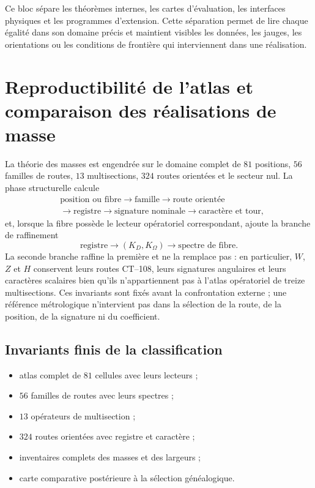Ce bloc sépare les théorèmes internes, les cartes d'évaluation, les
interfaces physiques et les programmes d'extension. Cette séparation permet de lire
chaque égalité dans son domaine précis et maintient visibles les données, les jauges,
les orientations ou les conditions de frontière qui interviennent dans une réalisation.

\HMTDemoteHeadings


\HMTRestoreHeadings

\chapter{Reproductibilité de l'atlas et comparaison des réalisations de masse}
\label{app:reproducibilidad-masas-acumulativa}
\label{app:suplemento-digital-masas-rev11}

La théorie des masses est engendrée sur le domaine complet de
\(81\) positions, \(56\) familles de routes, \(13\) multisections,
\(324\) routes orientées et le secteur nul. La phase structurelle calcule
\[
\begin{aligned}
&\text{position ou fibre}\longrightarrow\text{famille}
\longrightarrow\text{route orientée}\\
&\longrightarrow\text{registre}
\longrightarrow\text{signature nominale}\longrightarrow\text{caractère et tour},
\end{aligned}
\]
et, lorsque la fibre possède le lecteur opératoriel correspondant, ajoute la
branche de raffinement
\[
 \text{registre}\longrightarrow(K_D,K_\Omega)
 \longrightarrow\text{spectre de fibre}.
\]
La seconde branche raffine la première et ne la remplace pas : en particulier,
\(W\), \(Z\) et \(H\) conservent leurs routes CT--108, leurs signatures angulaires et
leurs caractères scalaires bien qu'ils n'appartiennent pas à l'atlas opératoriel de
treize multisections. Ces invariants sont fixés avant la confrontation externe ;
une référence métrologique n'intervient pas dans la sélection de la route, de la position,
de la signature ni du coefficient.

\section{Invariants finis de la classification}
\label{sec:fuentes-certificado-tabla-masas-acumulativa}

\begin{itemize}
 \item atlas complet de $81$ cellules avec leurs lecteurs ;
 \item $56$ familles de routes avec leurs spectres ;
 \item $13$ opérateurs de multisection ;
 \item $324$ routes orientées avec registre et caractère ;
 \item inventaires complets des masses et des largeurs ;
 \item carte comparative postérieure à la sélection généalogique.
\end{itemize}

